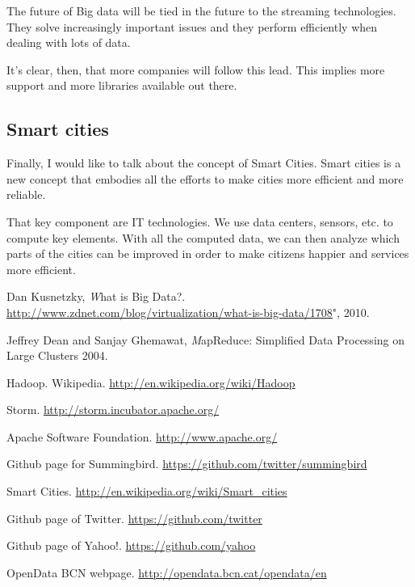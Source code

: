 The future of Big data will be tied in the future to the streaming
technologies. They solve increasingly important issues and they perform efficiently
when dealing with lots of data.

It's clear, then, that more companies will follow this lead. This implies more
support and more libraries available out there.

\subsection{Smart cities}

Finally, I would like to talk about the concept of Smart Cities\cite{smart}.
Smart cities is a new concept that embodies all the efforts to make cities more
efficient and more reliable.

That key component are IT technologies. We use data centers, sensors, etc. to
compute key elements. With all the computed data, we can then analyze which
parts of the cities can be improved in order to make citizens happier and
services more efficient.

\newpage

\renewcommand\refname{Bibliography}
\begin{thebibliography}{9}

  Dan Kusnetzky,
  {\emph What is Big Data?}.
  \url{http://www.zdnet.com/blog/virtualization/what-is-big-data/1708}",
  2010.

  Jeffrey Dean and Sanjay Ghemawat,
  {\emph MapReduce: Simplified Data Processing on Large Clusters}
  2004.

  Hadoop. Wikipedia.
  \url{http://en.wikipedia.org/wiki/Hadoop}

  Storm.
  \url{http://storm.incubator.apache.org/}

  Apache Software Foundation.
  \url{http://www.apache.org/}

  Github page for Summingbird.
  \url{https://github.com/twitter/summingbird}

  Smart Cities.
  \url{http://en.wikipedia.org/wiki/Smart_cities}

  Github page of Twitter.
  \url{https://github.com/twitter}

  Github page of Yahoo!.
  \url{https://github.com/yahoo}

  OpenData BCN webpage.
  \url{http://opendata.bcn.cat/opendata/en}

\end{thebibliography}
